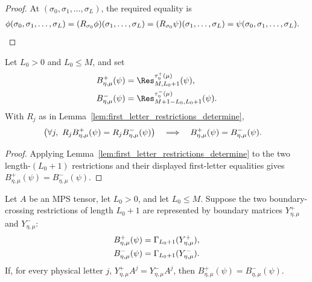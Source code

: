 \begin{proof}
    \leanok
    At $(\sigma_0,\sigma_1,\ldots,\sigma_L)$, the required equality is
    \begin{align}
        \phi(\sigma_0,\sigma_1,\ldots,\sigma_L)
         & = (R_{\sigma_0}\phi)(\sigma_1,\ldots,\sigma_L)
        = (R_{\sigma_0}\psi)(\sigma_1,\ldots,\sigma_L)
        = \psi(\sigma_0,\sigma_1,\ldots,\sigma_L).
        \notag
    \end{align}
\end{proof}

\begin{lemma}
    \label{lem:boundary_restriction_from_fixed_letters}
    \leanok
    Let $L_0>0$ and $L_0\le M$, and set
    \begin{align}
        B^+_{\eta,\mu}(\psi)
         & = \Res^{\tau^+_{\eta}(\mu)}_{M,L_0+1}(\psi),
        \notag                                                \\
        B^-_{\eta,\mu}(\psi)
         & = \Res^{\tau^-_{\eta}(\mu)}_{M+1-L_0,L_0+1}(\psi).
        \notag
    \end{align}
    With $R_j$ as in Lemma~\ref{lem:first_letter_restrictions_determine},
    \begin{align}
        \bigl(\forall j,\ R_jB^+_{\eta,\mu}(\psi)
        = R_jB^-_{\eta,\mu}(\psi)\bigr)
         & \quad\Longrightarrow\quad
        B^+_{\eta,\mu}(\psi)=B^-_{\eta,\mu}(\psi).
        \notag
    \end{align}
\end{lemma}

\begin{proof}
    \leanok
    Applying Lemma~\ref{lem:first_letter_restrictions_determine} to the two
    length-$(L_0+1)$ restrictions and their displayed first-letter equalities
    gives $B^+_{\eta,\mu}(\psi)=B^-_{\eta,\mu}(\psi)$.
\end{proof}

\begin{lemma}
    \label{lem:closed_boundary_restriction_from_right_products}
    \leanok
    Let $A$ be an MPS tensor, let $L_0>0$, and let $L_0\le M$. Suppose the two
    boundary-crossing restrictions of length $L_0+1$ are represented by boundary
    matrices $Y^+_{\eta,\mu}$ and $Y^-_{\eta,\mu}$:
    \begin{align}
        B^+_{\eta,\mu}(\psi)
         & = \Gamma_{L_0+1}(Y^+_{\eta,\mu}),
        \notag                               \\
        B^-_{\eta,\mu}(\psi)
         & = \Gamma_{L_0+1}(Y^-_{\eta,\mu}).
        \notag
    \end{align}
    If, for every physical letter $j$,
    $Y^+_{\eta,\mu}A^j = Y^-_{\eta,\mu}A^j$,
    then
    $B^+_{\eta,\mu}(\psi) = B^-_{\eta,\mu}(\psi)$.
\end{lemma}

